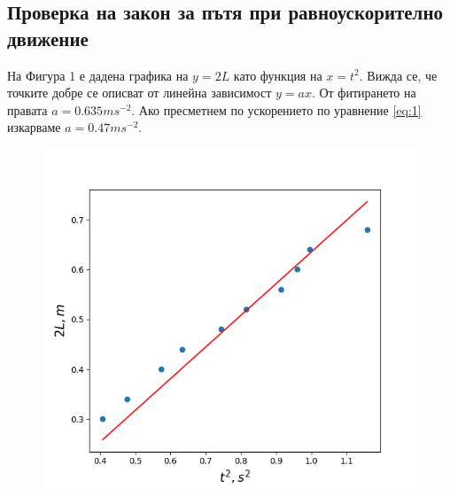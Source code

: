 \documentclass[aps, prb, twocolumn, a4paper, floatfix, reprint]{revtex4-2}
\begin{document}
\subsection{Проверка на закон за пътя при равноускорително движение}
На Фигура 1 е дадена графика на $y=2L$ като функция на $x=t^2$. Вижда се, че точките добре се описват от линейна зависимост $y=ax$. От фитирането на правата $a=0.635 ms^{-2}$. Ако пресметнем по ускорението по уравнение \eqref{eq:1} изкарваме $a=0.47 ms^{-2}$. 
\begin{figure}[H]
    \centering
    \caption{}
    \includegraphics[width=\columnwidth, keepaspectratio=true]{Figure_1.png}
\end{figure}
\end{document}
